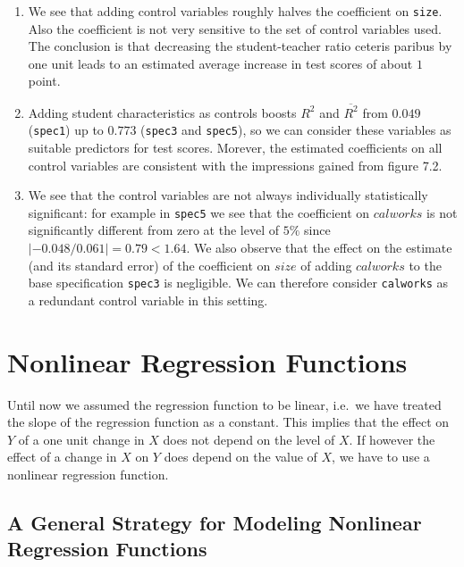 \documentclass[]{book}
\theoremstyle{definition}
\theoremstyle{definition}
\theoremstyle{definition}
\theoremstyle{remark}
\begin{document}
\begin{enumerate}
\def\labelenumi{\arabic{enumi}.}
\item
  We see that adding control variables roughly halves the coefficient on
  \texttt{size}. Also the coefficient is not very sensitive to the set
  of control variables used. The conclusion is that decreasing the
  student-teacher ratio ceteris paribus by one unit leads to an
  estimated average increase in test scores of about \(1\) point.
\item
  Adding student characteristics as controls boosts \(R^2\) and
  \(\overline{R^2}\) from \(0.049\) (\texttt{spec1}) up to \(0.773\)
  (\texttt{spec3} and \texttt{spec5}), so we can consider these
  variables as suitable predictors for test scores. Morever, the
  estimated coefficients on all control variables are consistent with
  the impressions gained from figure 7.2.
\item
  We see that the control variables are not always individually
  statistically significant: for example in \texttt{spec5} we see that
  the coefficient on \(calworks\) is not significantly different from
  zero at the level of \(5\%\) since
  \(\lvert-0.048/0.061\rvert=0.79 < 1.64\). We also observe that the
  effect on the estimate (and its standard error) of the coefficient on
  \(size\) of adding \(calworks\) to the base specification
  \texttt{spec3} is negligible. We can therefore consider
  \texttt{calworks} as a redundant control variable in this setting.
\end{enumerate}

\chapter{Nonlinear Regression
Functions}\label{nonlinear-regression-functions}

Until now we assumed the regression function to be linear, i.e.~we have
treated the slope of the regression function as a constant. This implies
that the effect on \(Y\) of a one unit change in \(X\) does not depend
on the level of \(X\). If however the effect of a change in \(X\) on
\(Y\) does depend on the value of \(X\), we have to use a nonlinear
regression function.

\section{A General Strategy for Modeling Nonlinear Regression
Functions}\label{a-general-strategy-for-modeling-nonlinear-regression-functions}
\end{document}
